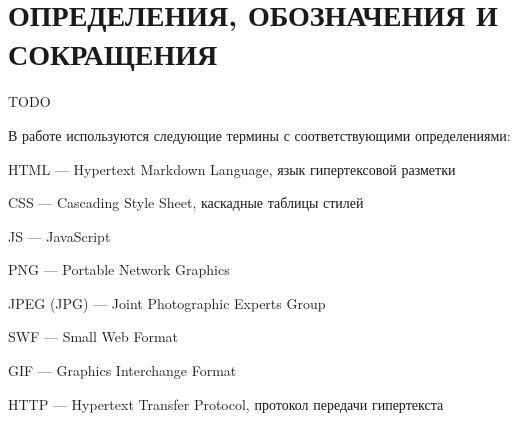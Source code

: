 \section*{\large ОПРЕДЕЛЕНИЯ, ОБОЗНАЧЕНИЯ И СОКРАЩЕНИЯ}

TODO

В работе используются следующие термины с соответствующими определениями:

HTML --- Hypertext Markdown Language, язык гипертексовой разметки

CSS --- Cascading Style Sheet, каскадные таблицы стилей

JS --- JavaScript

PNG --- Portable Network Graphics

JPEG (JPG) --- Joint Photographic Experts Group

SWF --- Small Web Format

GIF --- Graphics Interchange Format

HTTP --- Hypertext Transfer Protocol, протокол передачи гипертекста

\pagebreak